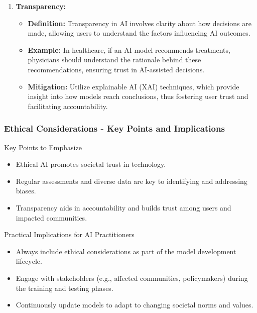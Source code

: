 \documentclass{beamer}
\begin{document}
\begin{frame}[fragile]
\begin{enumerate}
        \item \textbf{Transparency:}
        \begin{itemize}
            \item \textbf{Definition:} Transparency in AI involves clarity about how decisions are made, allowing users to understand the factors influencing AI outcomes.
            \item \textbf{Example:} In healthcare, if an AI model recommends treatments, physicians should understand the rationale behind these recommendations, ensuring trust in AI-assisted decisions.
            \item \textbf{Mitigation:} Utilize explainable AI (XAI) techniques, which provide insight into how models reach conclusions, thus fostering user trust and facilitating accountability.
        \end{itemize}
    \end{enumerate}
\end{frame}

\begin{frame}[fragile]
    \frametitle{Ethical Considerations - Key Points and Implications}
    \begin{block}{Key Points to Emphasize}
        \begin{itemize}
            \item Ethical AI promotes societal trust in technology.
            \item Regular assessments and diverse data are key to identifying and addressing biases.
            \item Transparency aids in accountability and builds trust among users and impacted communities.
        \end{itemize}
    \end{block}

    \begin{block}{Practical Implications for AI Practitioners}
        \begin{itemize}
            \item Always include ethical considerations as part of the model development lifecycle.
            \item Engage with stakeholders (e.g., affected communities, policymakers) during the training and testing phases.
            \item Continuously update models to adapt to changing societal norms and values.
        \end{itemize}
    \end{block}
\end{frame}
\end{document}
